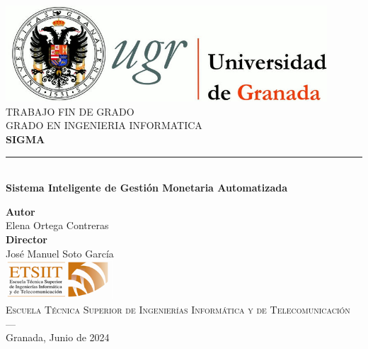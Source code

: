 \begin{titlepage}
    \newlength{\centeroffset}
    \setlength{\centeroffset}{-0.5\oddsidemargin}
    \addtolength{\centeroffset}{0.5\evensidemargin}
    \thispagestyle{empty}
    
    \noindent\hspace*{\centeroffset}
    \begin{minipage}{\textwidth}
    
    \centering
    \includegraphics[width=0.9\textwidth]{logos/logo_ugr.jpg}\\[1.4cm]
    
    \textsc{ \Large TRABAJO FIN DE GRADO\\[0.2cm]}
    \textsc{ GRADO EN INGENIERIA INFORMATICA}\\[1cm]
    
    {\Huge\bfseries SIGMA \\}
    \noindent\rule[-1ex]{\textwidth}{3pt}\\[3.5ex]
    {\large\bfseries Sistema Inteligente de Gestión Monetaria Automatizada }
    \end{minipage}
    
    \vspace{2.5cm}
    \noindent\hspace*{\centeroffset}
    \begin{minipage}{\textwidth}
    \centering
    
    \textbf{Autor}\\ {Elena Ortega Contreras}\\[2.5ex]
    \textbf{Director}\\ {José Manuel Soto García}\\[2cm]
    \includegraphics[width=0.3\textwidth]{logos/etsiit_logo.png}\\[0.1cm]
    \textsc{Escuela Técnica Superior de Ingenierías Informática y de Telecomunicación}\\
    \textsc{---}\\
    Granada, Junio de 2024
    \end{minipage}
    \end{titlepage}